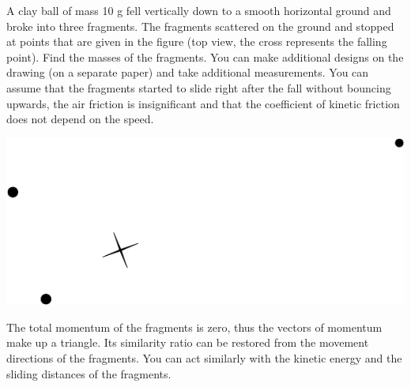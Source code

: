 A clay ball of mass 10 g fell vertically down to a smooth horizontal ground and broke into three fragments. The fragments scattered on the ground and stopped at points that are given in the figure (top view, the cross represents the falling point). Find the masses of the fragments. You can make additional designs on the drawing (on a separate paper) and take additional measurements. You can assume that the fragments started to slide right after the fall without bouncing upwards, the air friction is insignificant and that the coefficient of kinetic friction does not depend on the speed. 
\begin{center}
\includegraphics[width=0.8\linewidth]{2012-lahg-10-killud}
\end{center}

\hinteng
The total momentum of the fragments is zero, thus the vectors of momentum make up a triangle. Its similarity ratio can be restored from the movement directions of the fragments. You can act similarly with the kinetic energy and the sliding distances of the fragments.

